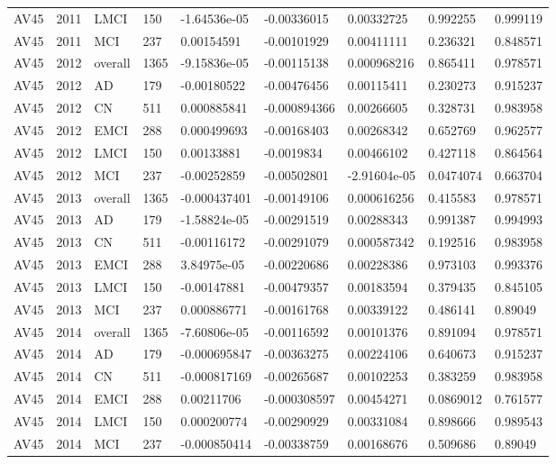 \begin{landscape}
\begin{longtable}{lllllllll}
AV45 & 2011 & LMCI & 150 & -1.64536e-05 & -0.00336015 & 0.00332725 & 0.992255 & 0.999119 \\
AV45 & 2011 & MCI & 237 & 0.00154591 & -0.00101929 & 0.00411111 & 0.236321 & 0.848571 \\
AV45 & 2012 & overall & 1365 & -9.15836e-05 & -0.00115138 & 0.000968216 & 0.865411 & 0.978571 \\
AV45 & 2012 & AD & 179 & -0.00180522 & -0.00476456 & 0.00115411 & 0.230273 & 0.915237 \\
AV45 & 2012 & CN & 511 & 0.000885841 & -0.000894366 & 0.00266605 & 0.328731 & 0.983958 \\
AV45 & 2012 & EMCI & 288 & 0.000499693 & -0.00168403 & 0.00268342 & 0.652769 & 0.962577 \\
AV45 & 2012 & LMCI & 150 & 0.00133881 & -0.0019834 & 0.00466102 & 0.427118 & 0.864564 \\
AV45 & 2012 & MCI & 237 & -0.00252859 & -0.00502801 & -2.91604e-05 & 0.0474074 & 0.663704 \\
AV45 & 2013 & overall & 1365 & -0.000437401 & -0.00149106 & 0.000616256 & 0.415583 & 0.978571 \\
AV45 & 2013 & AD & 179 & -1.58824e-05 & -0.00291519 & 0.00288343 & 0.991387 & 0.994993 \\
AV45 & 2013 & CN & 511 & -0.00116172 & -0.00291079 & 0.000587342 & 0.192516 & 0.983958 \\
AV45 & 2013 & EMCI & 288 & 3.84975e-05 & -0.00220686 & 0.00228386 & 0.973103 & 0.993376 \\
AV45 & 2013 & LMCI & 150 & -0.00147881 & -0.00479357 & 0.00183594 & 0.379435 & 0.845105 \\
AV45 & 2013 & MCI & 237 & 0.000886771 & -0.00161768 & 0.00339122 & 0.486141 & 0.89049 \\
AV45 & 2014 & overall & 1365 & -7.60806e-05 & -0.00116592 & 0.00101376 & 0.891094 & 0.978571 \\
AV45 & 2014 & AD & 179 & -0.000695847 & -0.00363275 & 0.00224106 & 0.640673 & 0.915237 \\
AV45 & 2014 & CN & 511 & -0.000817169 & -0.00265687 & 0.00102253 & 0.383259 & 0.983958 \\
AV45 & 2014 & EMCI & 288 & 0.00211706 & -0.000308597 & 0.00454271 & 0.0869012 & 0.761577 \\
AV45 & 2014 & LMCI & 150 & 0.000200774 & -0.00290929 & 0.00331084 & 0.898666 & 0.989543 \\
AV45 & 2014 & MCI & 237 & -0.000850414 & -0.00338759 & 0.00168676 & 0.509686 & 0.89049 \\

\end{longtable}
\end{landscape}
